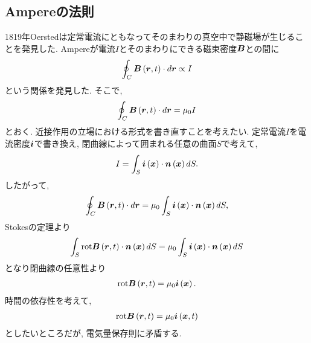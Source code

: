 \documentclass[10pt,a4paper]{jsarticle}
\begin{document}
\subsection{Ampereの法則}
1819年Oerstedは定常電流にともなってそのまわりの真空中で静磁場が生じることを発見した. Ampereが電流$I$とそのまわりにできる磁束密度$\bm{B}$との間に
\begin{align*}
    \oint_C \bm{B} \left( \bm{r}, t \right) \cdot d \bm{r} \propto I
\end{align*}
という関係を発見した. そこで, 
\begin{align*}
    \oint_C \bm{B} \left( \bm{r}, t \right) \cdot d \bm{r} = \mu_0 I    
\end{align*}
とおく. 近接作用の立場における形式を書き直すことを考えたい. 定常電流$I$を電流密度$\bm{i}$で書き換え, 閉曲線によって囲まれる任意の曲面$S$で考えて, 
\begin{align*}
    I = \int_S \bm{i} \left( \bm{x} \right) \cdot \bm{n} \left( \bm{x} \right) dS.
\end{align*}
したがって, 
\begin{align*}
    \oint_C \bm{B} \left( \bm{r}, t \right) \cdot d \bm{r} = \mu_0 \int_S \bm{i} \left( \bm{x} \right) \cdot \bm{n} \left( \bm{x} \right) dS,
\end{align*}
Stokesの定理より
\begin{align*}
    \int_S \mathrm{rot} \bm{B} \left( \bm{r}, t \right) \cdot \bm{n} \left( \bm{x} \right) dS = \mu_0 \int_S \bm{i} \left( \bm{x} \right) \cdot \bm{n} \left( \bm{x} \right) dS
\end{align*}
となり閉曲線の任意性より
\begin{align*}
    \mathrm{rot} \bm{B} \left( \bm{r}, t \right)  = \mu_0 \bm{i} \left( \bm{x} \right).
\end{align*}
時間の依存性を考えて, 
\begin{align*}
    \mathrm{rot} \bm{B} \left( \bm{r}, t \right)  = \mu_0 \bm{i} \left( \bm{x}, t \right)
\end{align*}
としたいところだが, 電気量保存則に矛盾する. 
\end{document}
